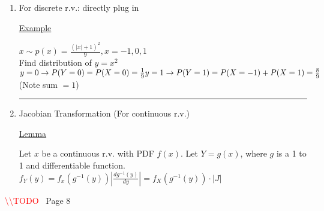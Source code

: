 \documentclass[12pt]{article}
\newenvironment{block}[1][Label]{\underline{#1}\par}{}
\newcommand{\pp}[1]{\left(#1\right)}
\newcommand{\abs}[1]{\left|#1\right|}
\newcommand{\divider}[0]{\par\textcolor{lightgray}{\rule{\textwidth}{0.1pt}}}
\newenvironment{example}{\shownto{-,notes}\underline{Example}\par}{\par\divider\endshownto}
\newcommand{\todo}[0]{\textcolor{red}{\textbackslash\textbackslash TODO \ }}
\begin{document}
\begin{enumerate}
	\item For discrete r.v.: directly plug in
	
	\begin{example}
		$x \sim p(x) = \frac{(\lvert x \rvert + 1)^2}{9}, x = -1, 0, 1$ \\
		Find distribution of $y = x^2$ \\
		$y = 0 \rightarrow P(Y = 0) = P(X = 0) = \frac{1}{9} \\ y = 1 \rightarrow P(Y = 1) = P(X = -1) + P(X = 1) = \frac{8}{9}$ \\
		(Note sum $ = 1$) 
	\end{example}

	\item Jacobian Transformation (For continuous r.v.)
	
	\begin{block}[Lemma]
		Let $x$ be a continuous r.v. with PDF $f(x)$. Let $Y = g(x)$, where $g$ is a 1 to 1 and differentiable function. \\
		$f_Y(y) = f_x\pp{g^{-1}(y)} \abs{\frac{dg^{-1}(y)}{dy}} = f_X \pp{g^{-1} (y)} \cdot \abs{J}$
	\end{block}
\end{enumerate}

\todo Page 8
\end{document}
